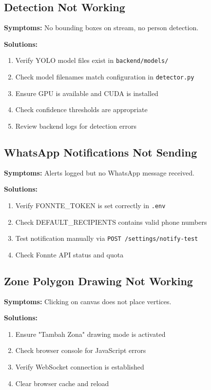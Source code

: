 \documentclass[12pt,a4paper,oneside]{book}
\begin{document}
\subsection{Detection Not Working}

\textbf{Symptoms:} No bounding boxes on stream, no person detection.

\textbf{Solutions:}
\begin{enumerate}
    \item Verify YOLO model files exist in \texttt{backend/models/}
    \item Check model filenames match configuration in \texttt{detector.py}
    \item Ensure GPU is available and CUDA is installed
    \item Check confidence thresholds are appropriate
    \item Review backend logs for detection errors
\end{enumerate}

\subsection{WhatsApp Notifications Not Sending}

\textbf{Symptoms:} Alerts logged but no WhatsApp message received.

\textbf{Solutions:}
\begin{enumerate}
    \item Verify FONNTE\_TOKEN is set correctly in \texttt{.env}
    \item Check DEFAULT\_RECIPIENTS contains valid phone numbers
    \item Test notification manually via \texttt{POST /settings/notify-test}
    \item Check Fonnte API status and quota
\end{enumerate}

\subsection{Zone Polygon Drawing Not Working}

\textbf{Symptoms:} Clicking on canvas does not place vertices.

\textbf{Solutions:}
\begin{enumerate}
    \item Ensure "Tambah Zona" drawing mode is activated
    \item Check browser console for JavaScript errors
    \item Verify WebSocket connection is established
    \item Clear browser cache and reload
\end{enumerate}
\end{document}
